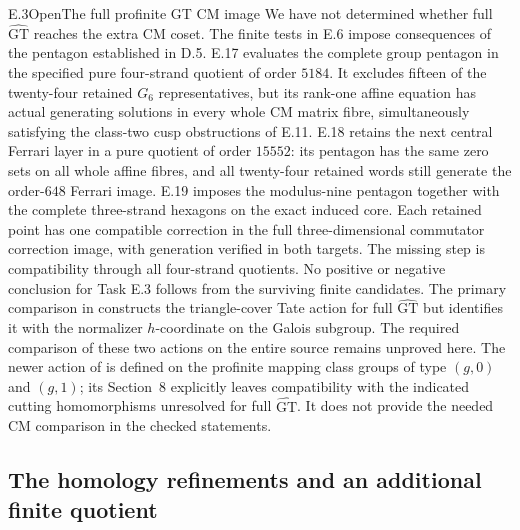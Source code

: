 \begin{statement}{E.3}{Open}{The full profinite GT CM image}
We have not determined whether full $\widehat{\mathrm{GT}}$ reaches
the extra CM coset. The finite tests in E.6 impose consequences of
the pentagon established in D.5. E.17 evaluates the complete group
pentagon in the specified pure four-strand quotient of order $5184$.
It excludes fifteen of the twenty-four retained $G_6$ representatives,
but its rank-one affine equation has actual generating solutions in
every whole CM matrix fibre, simultaneously satisfying the class-two
cusp obstructions of E.11. E.18 retains the next central Ferrari
layer in a pure quotient of order $15552$: its pentagon has the
same zero sets on all whole affine fibres, and all twenty-four
retained words still generate the order-$648$ Ferrari image.
E.19 imposes the modulus-nine pentagon together with the complete
three-strand hexagons on the exact induced core. Each retained
point has one compatible correction in the full three-dimensional
commutator correction image, with generation verified in both
targets.
The missing step is compatibility through
all four-strand quotients. No positive or negative conclusion for
Task E.3 follows from the surviving finite candidates.
The primary comparison in
\cite[Proposition~4.4 and Theorem~4.16]{DE_NakamuraTsunogaiYasuda2010}
constructs the triangle-cover Tate action for full
$\widehat{\mathrm{GT}}$ but identifies it with the normalizer
$h$-coordinate on the Galois subgroup. The required comparison
of these two actions on the entire source remains unproved here.
The newer action of
\cite[Theorem~1.1]{DE_LochakNakamuraSchneps2026}
is defined on the profinite mapping class groups of type $(g,0)$
and $(g,1)$; its Section~8 explicitly leaves compatibility with
the indicated cutting homomorphisms unresolved for full
$\widehat{\mathrm{GT}}$. It does not provide the needed CM
comparison in the checked statements.
\end{statement}

\subsection{The homology refinements and an additional finite quotient}


